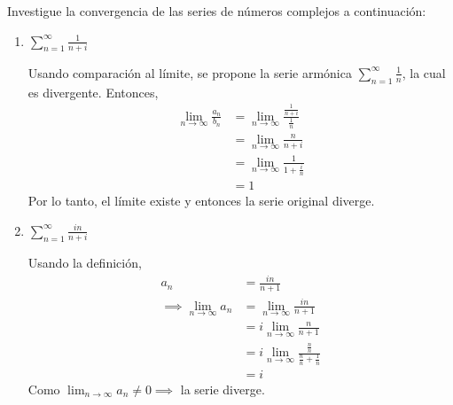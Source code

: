 \begin{problema}[15p]
    Investigue la convergencia de las series de números complejos a continuación:
    \begin{enumerate}
        \item $\sum_{n=1}^{\infty} \frac{1}{n+i}$
        \begin{sol}
            Usando comparación al límite, se propone la serie armónica $\sum_{n=1}^{\infty}\frac{1}{n}$, la cual es divergente. Entonces, 
            \begin{align*}
                \lim_{n\to\infty}\frac{a_n}{b_n} &= \lim_{n\to\infty}\frac{\frac{1}{n+i}}{\frac{1}{n}}\\
                &= \lim_{n\to\infty}\frac{n}{n+i}\\
                &= \lim_{n\to\infty}\frac{1}{1+\frac{i}{n}}\\
                &= 1
            \end{align*}
            Por lo tanto, el límite existe y entonces la serie original diverge. 
        \end{sol}
        \item $\sum_{n=1}^{\infty} \frac{i n}{n+i}$
        \begin{sol}
            Usando la definición, 
            \begin{align*}
                a_n &=\frac{in}{n+1}\\
                \implies \lim_{n\to\infty}a_n &=\lim_{n\to\infty}\frac{in}{n+1}\\
                                     &=i\lim_{n\to\infty}\frac{n}{n+1}\\
                                     &=i\lim_{n\to\infty}\frac{\frac{n}{n}}{\frac{n}{n}+\frac{1}{n}}\\
                                     &= i
            \end{align*}
            Como $\lim_{n\to\infty}a_n\neq 0\implies$ la serie diverge. 
        \end{sol}
    \end{enumerate}

\end{problema}

